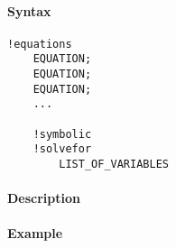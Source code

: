 


	\paragraph{Syntax}

\begin{verbatim}
!equations
    EQUATION;
    EQUATION;
    EQUATION;
    ...

    !symbolic
    !solvefor
        LIST_OF_VARIABLES
\end{verbatim}

\paragraph{Description}

\paragraph{Example}


